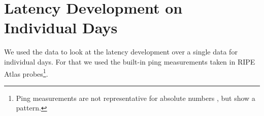 \section{Latency Development on Individual Days} \label{sec:latency-individual-days}

We used the data to look at the latency development over a single data for individual days.
For that we used the built-in ping measurements taken in RIPE Atlas probes\footnote{Ping measurements are not representative for absolute numbers \cite{DBLP:conf/imc/PelsserCVB13}, but show a pattern.}.

